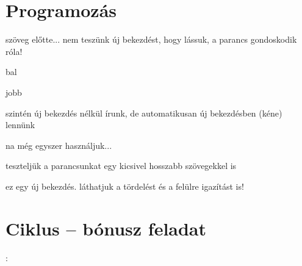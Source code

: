 \documentclass[twocolumn]{report}
\theoremstyle{definition} %
\newcommand{\centerpair}[2]{%
\par\noindent%
\begin{minipage}[t]{0.48\linewidth}%
\begin{flushright}%
#1%
\end{flushright}%
\end{minipage}%
\hfill\vline\hfill%
\begin{minipage}[t]{0.48\linewidth}%
\begin{flushleft}%
#2%
\end{flushleft}%
\end{minipage}%
\par}
\begin{document}
\hulipsum

\chapter{Programozás}

szöveg előtte... nem teszünk új bekezdést, hogy lássuk, a parancs gondoskodik róla!
\centerpair{bal}{jobb}
szintén új bekezdés nélkül írunk, de automatikusan új bekezdésben (kéne) lennünk

\centerpair{na még egyszer használjuk...}{teszteljük a parancsunkat egy kicsivel hosszabb szövegekkel is\par ez egy új bekezdés. láthatjuk a tördelést és a felülre igazítást is!}

\chapter{Ciklus -- bónusz feladat}

\setcounter{hatvany}{1} %
{%
\theindex:~\thehatvany\\%
%
}
\end{document}
